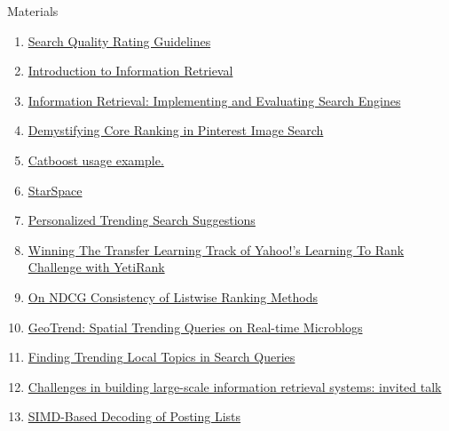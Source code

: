 \documentclass[10pt]{beamer}
\begin{document}
\begin{frame}{Materials}
\begin{enumerate}
    \item \href{https://static.googleusercontent.com/media/guidelines.raterhub.com/en//searchqualityevaluatorguidelines.pdf}{Search Quality Rating Guidelines}
    \item \href{https://nlp.stanford.edu/IR-book/information-retrieval-book.html}{Introduction to Information Retrieval}
    \item \href{https://www.amazon.com/Information-Retrieval-Implementing-Evaluating-Engines/dp/0262528878}{Information Retrieval: Implementing and Evaluating Search Engines}
    \item \href{https://arxiv.org/pdf/1803.09799.pdf}{Demystifying Core Ranking in Pinterest Image Search}
    \item \href{https://github.com/catboost/tutorials/blob/master/ranking/ranking_tutorial.ipynb}{Catboost usage example.}
    \item \href{https://github.com/facebookresearch/StarSpace.git}{StarSpace}
    \item \href{https://www.microsoft.com/en-us/research/wp-content/uploads/2016/08/fp073-wu.pdf}{Personalized Trending Search Suggestions}
    \item \href{http://proceedings.mlr.press/v14/gulin11a/gulin11a.pdf}{Winning The Transfer Learning Track of Yahoo!’s Learning To Rank Challenge with YetiRank}
    \item \href{https://www.cs.cmu.edu/~pradeepr/paperz/ndcg.pdf}{On NDCG Consistency of Listwise Ranking Methods}
    \item \href{https://dl.acm.org/doi/abs/10.1145/2996913.2996986}{GeoTrend: Spatial Trending Queries on Real-time Microblogs}
    \item \href{https://dl.acm.org/doi/abs/10.1145/2339530.2339594}{Finding Trending Local Topics in Search Queries}
    \item \href{https://research.google/pubs/pub37797/}{Challenges in building large-scale information retrieval systems: invited talk}
    \item \href{http://stepanovpapers.com/SIMD_Decoding_TR.pdf}{SIMD-Based Decoding of Posting Lists}
\end{enumerate}
\end{frame}
\end{document}
